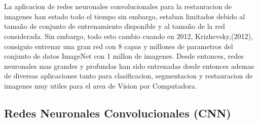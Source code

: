 \documentclass[10pt,letterpaper]{article}
\begin{document}
\\\\
La aplicacion de redes neuronales convolucionales para la restauracion de imagenes  han estado todo el tiempo sin embargo, estaban limitados debido al tamaño de conjunto de entrenamiento disponible y al tamaño de la red considerada. Sin embargo, todo esto cambio cuando en 2012, Krizhevsky,(2012)\cite{Kriz:Suts}, consiguio entrenar una gran red con 8 capas y millones de parametros del conjunto de datos ImageNet con 1 millon de imagenes. Desde entonces, redes neuronales mas grandes y profundas han sido entrenadas desde entonces ademas de diversas aplicaciones tanto para clasificacion, segmentacion y restauracion de imagenes muy utiles para el area de Vision por Computadora\cite{cite1}.

\subsection*{Redes Neuronales Convolucionales (CNN)}
\end{document}
